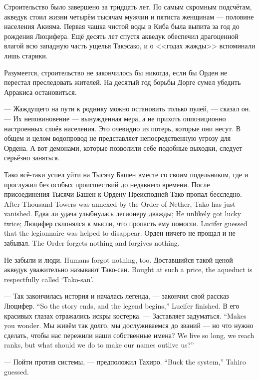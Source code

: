 Строительство было завершено за тридцать лет.
По самым скромным подсчётам, акведук стоил жизни четырём тысячам мужчин и пятиста женщинам --- половине населения Акияма.
Первая чашка чистой воды в Киба была выпита за год до рождения Люцифера.
Ещё десять лет спустя акведук обеспечил драгоценной влагой всю западную часть ущелья Такэсако, и о <<годах жажды>> вспоминали лишь старики.

Разумеется, строительство не закончилось бы никогда, если бы Орден не перестал преследовать жителей.
На десятый год борьбы Дорге сумел убедить Арракиса остановиться.

--- Жаждущего на пути к роднику можно остановить только пулей, --- сказал он.
--- Их неповиновение --- вынужденная мера, а не прихоть оппозиционно настроенных слоёв населения.
Это очевидно из потерь, которые они несут.
В общем и целом водопровод не представляет непосредственную угрозу для Ордена.
А вот демонами, которые позволили себе подобные выходки, следует серьёзно заняться.

Тако всё-таки успел уйти на Тысячу Башен вместе со своим подельником, где и прослужил без особых происшествий до недавнего времени.
{После присоединения Тысячи Башен к Ордену Преисподней Тако пропал бесследно.}
{After Thousand Towers was annexed by the Order of Nether, Tako has just vanished.}
{Едва ли удача улыбнулась легионеру дважды;}
{He unlikely got lucky twice;}
{Люцифер склонялся к мысли, что пропасть ему помогли.}
{Lucifer guessed that the legionnaire was helped to disappear.}
{Орден ничего не прощал и не забывал.}
{The Order forgets nothing and forgives nothing.}

{Не забыли и люди.}
{Humans forgot nothing, too.}
{Доставшийся такой ценой акведук уважительно называют Тако-сан.}
{Bought at such a price, the aqueduct is respectfully called `Tako-san'.}

{--- Так закончилась история и началась легенда, --- закончил свой рассказ Люцифер.}
{``So the story ends, and the legend begins,'' Lucifer finished.}
В его красивых глазах отражались искры костерка.
{--- Заставляет задуматься.}
{``Makes you wonder.}
{Мы живём так долго, мы дослуживаемся до званий --- но что нужно сделать, чтобы нас пережили наши собственные имена?}
{We live so long, we reach ranks, but what should we do to make our names outlive us?''}

{--- Пойти против системы, --- предположил Тахиро.}
{``Buck the system,'' Tahiro guessed.}

